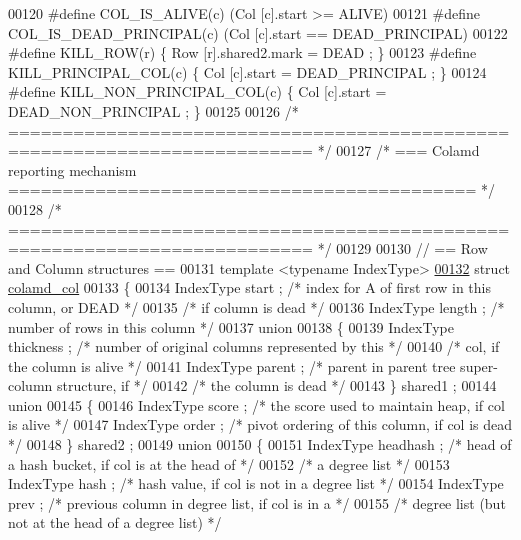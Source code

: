 \begin{DoxyCode}
00120 \textcolor{preprocessor}{#define COL\_IS\_ALIVE(c)     (Col [c].start >= ALIVE)}
00121 \textcolor{preprocessor}{#define COL\_IS\_DEAD\_PRINCIPAL(c)  (Col [c].start == DEAD\_PRINCIPAL)}
00122 \textcolor{preprocessor}{#define KILL\_ROW(r)     \{ Row [r].shared2.mark = DEAD ; \}}
00123 \textcolor{preprocessor}{#define KILL\_PRINCIPAL\_COL(c)   \{ Col [c].start = DEAD\_PRINCIPAL ; \}}
00124 \textcolor{preprocessor}{#define KILL\_NON\_PRINCIPAL\_COL(c) \{ Col [c].start = DEAD\_NON\_PRINCIPAL ; \}}
00125 
00126 \textcolor{comment}{/* ========================================================================== */}
00127 \textcolor{comment}{/* === Colamd reporting mechanism =========================================== */}
00128 \textcolor{comment}{/* ========================================================================== */}
00129 
00130 \textcolor{comment}{// == Row and Column structures ==}
00131 \textcolor{keyword}{template} <\textcolor{keyword}{typename} IndexType>
\hyperlink{structinternal_1_1colamd__col}{00132} \textcolor{keyword}{struct }\hyperlink{structinternal_1_1colamd__col}{colamd\_col}
00133 \{
00134   IndexType start ;   \textcolor{comment}{/* index for A of first row in this column, or DEAD */}
00135   \textcolor{comment}{/* if column is dead */}
00136   IndexType length ;  \textcolor{comment}{/* number of rows in this column */}
00137   \textcolor{keyword}{union}
00138   \{
00139     IndexType thickness ; \textcolor{comment}{/* number of original columns represented by this */}
00140     \textcolor{comment}{/* col, if the column is alive */}
00141     IndexType parent ;  \textcolor{comment}{/* parent in parent tree super-column structure, if */}
00142     \textcolor{comment}{/* the column is dead */}
00143   \} shared1 ;
00144   \textcolor{keyword}{union}
00145   \{
00146     IndexType score ; \textcolor{comment}{/* the score used to maintain heap, if col is alive */}
00147     IndexType order ; \textcolor{comment}{/* pivot ordering of this column, if col is dead */}
00148   \} shared2 ;
00149   \textcolor{keyword}{union}
00150   \{
00151     IndexType headhash ;  \textcolor{comment}{/* head of a hash bucket, if col is at the head of */}
00152     \textcolor{comment}{/* a degree list */}
00153     IndexType hash ;  \textcolor{comment}{/* hash value, if col is not in a degree list */}
00154     IndexType prev ;  \textcolor{comment}{/* previous column in degree list, if col is in a */}
00155     \textcolor{comment}{/* degree list (but not at the head of a degree list) */}

\end{DoxyCode}
